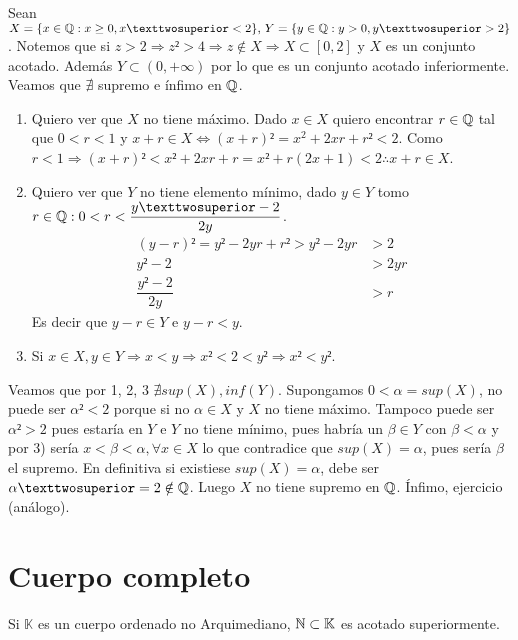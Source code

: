 \begin{eg}
    Sean $X = \{ x \in \Q : x \geq 0, x² < 2 \}\text{, } Y = \{ y \in \Q : y>0, y² > 2 \}$. Notemos que si $z>2 \Rightarrow z² > 4 \Rightarrow z \notin X \Rightarrow X \subset [0, 2]$ y $X$ es un conjunto acotado. Además $Y \subset (0, +\infty)$ por lo que es un conjunto acotado inferiormente. Veamos que $\nexists$ supremo e ínfimo en $\mathbb{Q}$. \begin{enumerate}
        \item Quiero ver que $X$ no tiene máximo. Dado $x \in X$ quiero encontrar $r \in \mathbb{Q}$ tal que $0<r<1$ y $x+r \in X \iff (x+r)² =x^2+2xr+r² < 2$. Como $r<1 \Rightarrow (x+r)²<x²+2xr+r=x²+r(2x+1)<2 \therefore x+r \in X$.
        \item Quiero ver que $Y$ no tiene elemento mínimo, dado $y \in Y$ tomo $r \in \Q : 0 < r < \dfrac{y²-2}{2y}$.
              \begin{align*}
                  (y - r)²          = y² - 2yr + r² > y² - 2yr & > 2   \\
                  y² - 2                                       & > 2yr \\
                  \dfrac{y²-2}{2y}                             & > r
              \end{align*}
              Es decir que $y-r \in Y$ e $y-r < y$.
        \item Si $x \in X, y \in Y \Rightarrow x < y \Rightarrow x² < 2 < y² \Rightarrow x² < y²$.
    \end{enumerate}

    Veamos que por 1, 2, 3 $\nexists sup(X), inf(Y)$. Supongamos $0< \alpha = sup(X)$, no puede ser $\alpha²<2$ porque si no $\alpha \in X$ y $X$ no tiene máximo. Tampoco puede ser $\alpha² > 2$ pues estaría en $Y$ e $Y$ no tiene mínimo, pues habría un $\beta \in Y$ con $\beta < \alpha$ y por 3) sería $x < \beta < \alpha, \forall x \in X$ lo que contradice que $sup(X) = \alpha$, pues sería $\beta$ el supremo.
    En definitiva si existiese $sup(X) = \alpha$, debe ser $\alpha² = 2 \notin \Q$. Luego $X$ no tiene supremo en $\mathbb{Q}$.
    Ínfimo, ejercicio (análogo).
\end{eg}

\section{Cuerpo completo}

\begin{definition}
    Si $\mathbb{K}$ es un cuerpo ordenado no Arquimediano, $\mathbb{N} \subset \mathbb{K}$ es acotado superiormente.
\end{definition}

